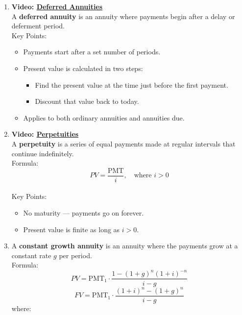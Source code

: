 \documentclass[
]{book}
\providecommand{\tightlist}{%
  \setlength{\itemsep}{0pt}\setlength{\parskip}{0pt}}
\begin{document}
\begin{enumerate}
\def\labelenumi{\arabic{enumi}.}
\tightlist
\item
  \textbf{Video: \href{https://youtu.be/S5UgF1tzz6s}{Deferred Annuities}}\\
  A \textbf{deferred annuity} is an annuity where payments begin after a delay or deferment period.\\
  Key Points:

  \begin{itemize}
  \tightlist
  \item
    Payments start after a set number of periods.
  \item
    Present value is calculated in two steps:

    \begin{itemize}
    \tightlist
    \item
      Find the present value at the time just before the first payment.
    \item
      Discount that value back to today.
    \end{itemize}
  \item
    Applies to both ordinary annuities and annuities due.
  \end{itemize}
\item
  \textbf{Video: \href{https://youtu.be/CNq74zq-Jns}{Perpetuities}}\\
  A \textbf{perpetuity} is a series of equal payments made at regular intervals that continue indefinitely.\\
  Formula:
  \[
  PV = \frac{\text{PMT}}{i}, \quad \text{where } i > 0
  \]\\
  Key Points:

  \begin{itemize}
  \tightlist
  \item
    No maturity --- payments go on forever.
  \item
    Present value is finite as long as \(i > 0\).
  \end{itemize}
\item
  A \textbf{constant growth annuity} is an annuity where the payments grow at a constant rate \(g\) per period.\\
  Formula:
  \[
  PV = \text{PMT}_1 \cdot \frac{1 - (1+g)^n(1+i)^{-n}}{i-g}
  \]
  \[
  FV = \text{PMT}_1 \cdot \frac{(1+i)^n- (1+g)^n}{i-g}
  \]
  where:


\end{enumerate}
\end{document}

